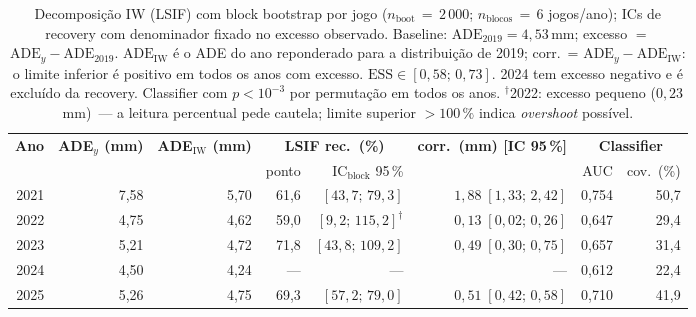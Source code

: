 \documentclass[runningheads]{llncs}
\begin{document}
\begin{table}[t]
\centering
\caption{Decomposi\c{c}\~ao IW (LSIF) com block bootstrap por jogo
         ($n_{\text{boot}}\,{=}\,2\,000$; $n_{\text{blocos}}\,{=}\,6$ jogos/ano);
         ICs de recovery com denominador fixado no excesso observado.
         Baseline: $\mathrm{ADE}_{2019} = 4{,}53$\,mm; excesso $=$
         $\mathrm{ADE}_y - \mathrm{ADE}_{2019}$. $\mathrm{ADE}_{\mathrm{IW}}$
         \'e o ADE do ano reponderado para a distribui\c{c}\~ao de 2019;
         corr.\ = $\mathrm{ADE}_y - \mathrm{ADE}_{\mathrm{IW}}$: o limite
         inferior \'e positivo em todos os anos com excesso.
         $\mathrm{ESS} \in [0{,}58;\,0{,}73]$. 2024 tem excesso negativo e \'e
         exclu\'ido da recovery. Classifier com $p < 10^{-3}$ por permuta\c{c}\~ao
         em todos os anos. $^{\dagger}$2022: excesso pequeno ($0{,}23$\,mm)~---
         a leitura percentual pede cautela; limite superior $>100\,\%$ indica
         \emph{overshoot} poss\'ivel.}
\label{tab:iw_decomp}
\scriptsize
\begin{tabular}{rrrrrrrr}
\toprule
\multirow{2}{*}{\textbf{Ano}}
  & \multirow{2}{*}{\parbox{1.05cm}{\centering\textbf{ADE$_y$\\(mm)}}}
  & \multirow{2}{*}{\parbox{1.05cm}{\centering\textbf{ADE$_{\mathrm{IW}}$\\(mm)}}}
  & \multicolumn{2}{c}{\textbf{LSIF rec.\ (\%)}}
  & \multirow{2}{*}{\textbf{corr.\ (mm) [IC 95\,\%]}}
  & \multicolumn{2}{c}{\textbf{Classifier}} \\
\cmidrule(lr){4-5}\cmidrule(lr){7-8}
   & & & ponto & IC$_{\text{block}}$ 95\,\% &  & AUC & cov.\ (\%) \\
\midrule
2021 & 7{,}58 & 5{,}70 & 61{,}6 & $[43{,}7;\,79{,}3]$   & $1{,}88\;[1{,}33;\,2{,}42]$ & 0{,}754 & 50{,}7 \\
2022 & 4{,}75 & 4{,}62 & 59{,}0 & $[9{,}2;\,115{,}2]^{\dagger}$ & $0{,}13\;[0{,}02;\,0{,}26]$ & 0{,}647 & 29{,}4 \\
2023 & 5{,}21 & 4{,}72 & 71{,}8 & $[43{,}8;\,109{,}2]$  & $0{,}49\;[0{,}30;\,0{,}75]$ & 0{,}657 & 31{,}4 \\
2024 & 4{,}50 & 4{,}24 & ---    & ---                   & --- & 0{,}612 & 22{,}4 \\
2025 & 5{,}26 & 4{,}75 & 69{,}3 & $[57{,}2;\,79{,}0]$   & $0{,}51\;[0{,}42;\,0{,}58]$ & 0{,}710 & 41{,}9 \\
\bottomrule
\end{tabular}
\end{table}
\end{document}
